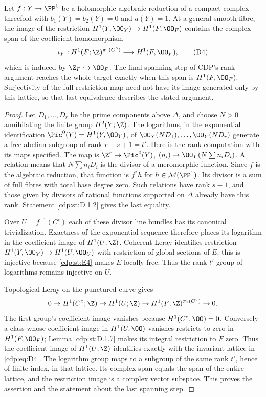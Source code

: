
\begin{proposition}\label{cdp:st:D.1.10}
Let $f:Y\to\PP^1$ be a holomorphic algebraic reduction of a compact
complex threefold with $b_1(Y)=b_2(Y)=0$ and $a(Y)=1$.
At a general smooth fibre, the image of the restriction
$H^1(Y,\OO_Y)\to H^1(F,\OO_F)$ contains the complex span of
the coefficient homomorphism
\[
\iota_F:H^1(F;\Z)^{\pi_1(C^\circ)}
 \longrightarrow H^1(F,\OO_F),                         \tag{D4}\label{cdp:eq:D4}
\]
which is induced by $\Z_F\hookrightarrow\OO_F$.
The final spanning step of CDP's rank argument reaches the whole
target exactly when this span is $H^1(F,\OO_F)$. Surjectivity of
the full restriction map need not have its image generated only by
this lattice, so that last equivalence describes the stated argument.
\end{proposition}
\begin{proof}
Let $D_1,\ldots,D_r$ be the prime components above $\Delta$, and
choose $N>0$ annihilating the finite group $H^2(Y;\Z)$.
The logarithms, in the exponential identification
$\Pic^0(Y)=H^1(Y,\OO_Y)$, of
$\OO_Y(ND_1),\ldots,\OO_Y(ND_r)$ generate a free abelian
subgroup of rank $r-s+1=t'$.
Here is the rank computation with its maps specified. The map is
$\Z^r\to\Pic^0(Y)$, $(n_i)\mapsto\OO_Y(N\sum n_iD_i)$.
A relation means that $N\sum n_iD_i$ is the divisor of a
meromorphic function. Since $f$ is the algebraic reduction, that
function is $f^*h$ for $h\in\mathcal M(\PP^1)$.
Its divisor is a sum of full fibres with total base degree zero.
Such relations have rank $s-1$, and those given by divisors of
rational functions supported on $\Delta$ already have this rank.
Statement \ref{cdp:st:D.1.2} gives the last equality.

Over $U=f^{-1}(C^\circ)$ each of these divisor line bundles has
its canonical trivialization. Exactness of the exponential sequence
therefore places its logarithm in the coefficient image of
$H^1(U;\Z)$. Coherent Leray identifies restriction
$H^1(Y,\OO_Y)\to H^1(U,\OO_U)$ with restriction of global
sections of $E$; this is injective because \ref{cdp:st:E4} makes $E$ locally free.
Thus the rank-$t'$ group of logarithms remains injective on $U$.

Topological Leray on the punctured curve gives
\[
0\to H^1(C^\circ;\Z)\to H^1(U;\Z)
\to H^1(F;\Z)^{\pi_1(C^\circ)}\to0.
\]
The first group's coefficient image vanishes because
$H^1(C^\circ,\OO)=0$. Conversely a class whose coefficient image
in $H^1(U,\OO)$ vanishes restricts to zero in $H^1(F,\OO_F)$;
Lemma \ref{cdp:st:D.1.7} makes its integral restriction to $F$ zero. Thus the
coefficient image of $H^1(U;\Z)$ identifies exactly with the
invariant lattice in \eqref{cdp:eq:D4}. The logarithm group maps to a subgroup
of the same rank $t'$, hence of finite index, in that lattice.
Its complex span equals the span of the entire lattice, and the
restriction image is a complex vector subspace. This proves the
assertion and the statement about the last spanning step.
\end{proof}


